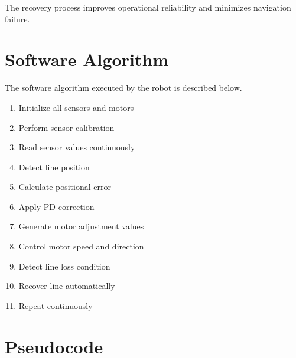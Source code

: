 \documentclass[12pt,a4paper,oneside]{report}
\begin{document}
The recovery process improves operational reliability and minimizes navigation failure.


\section{Software Algorithm}

The software algorithm executed by the robot is described below.

\begin{enumerate}

\item Initialize all sensors and motors

\item Perform sensor calibration

\item Read sensor values continuously

\item Detect line position

\item Calculate positional error

\item Apply PD correction

\item Generate motor adjustment values

\item Control motor speed and direction

\item Detect line loss condition

\item Recover line automatically

\item Repeat continuously

\end{enumerate}


\section{Pseudocode}
\end{document}
